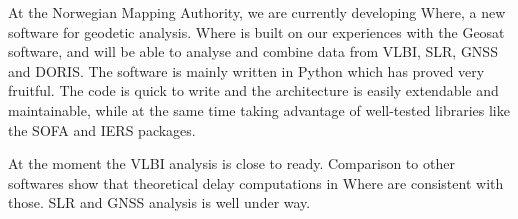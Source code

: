 At the Norwegian Mapping Authority, we are currently developing Where, a new
software for geodetic analysis. Where is built on our experiences with the
Geosat software, and will be able to analyse and combine data from VLBI, SLR,
GNSS and DORIS. The software is mainly written in Python which has proved very
fruitful. The code is quick to write and the architecture is easily extendable
and maintainable, while at the same time taking advantage of well-tested libraries
like the SOFA and IERS packages.

At the moment the VLBI analysis is close to ready. Comparison to other softwares
show that theoretical delay computations in Where are consistent with those. SLR
and GNSS analysis is well under way.

\vspace*{-10cm}

\endinput
